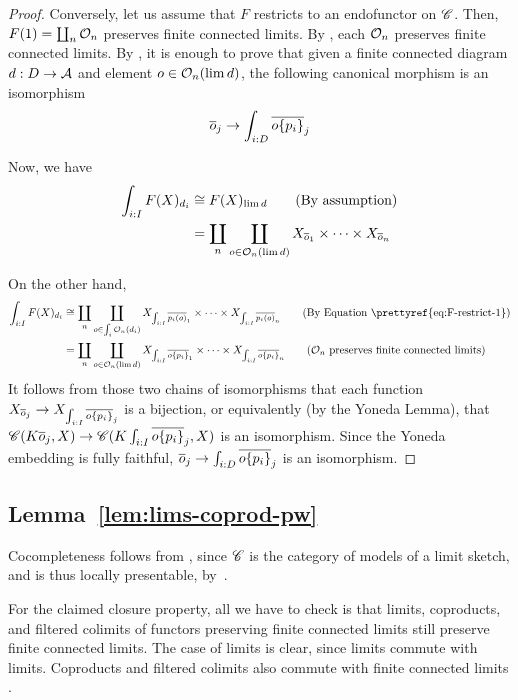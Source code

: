 \begin{proof}
Conversely, let us assume that $F$ restricts to an endofunctor on
$\C$. Then, $F(1)=\coprod_{n}\Oby n$ preserves finite connected
limits. By , each $\Oby n$ preserves finite
connected limits. By , it is enough to prove
that given a finite connected diagram $d:D\rightarrow{\cal A}$ and
element $o\in\Oop n{\lim d}$, the following canonical morphism is
an isomorphism
\[
\nthar oj\rightarrow\int_{i:D}\nthar{\rename o{p_{i}}}j
\]

Now, we have
\begin{align*}
\int_{i:I}F(X)_{d_{i}} & \cong F(X)_{\lim d}\tag{By assumption}\\
 & =\coprod_{n}\coprod_{o\in\Oop n{\lim d}}X_{\nthar o1}\times\dots\times X_{\nthar on}
\end{align*}

On the other hand,
\begin{align*}
\int_{i:I}F(X)_{d_{i}} & \cong\coprod_{n}\coprod_{o\in\int_{i}\Oop n{d_{i}}}X_{\int_{i:I}\nthar{p_{i}(o)}1}\times\dots\times X_{\int_{i:I}\nthar{p_{i}(o)}n}\tag{By Equation \prettyref{eq:F-restrict-1}}\\
 & =\coprod_{n}\coprod_{o\in\Oop n{\lim d}}X_{\int_{i:I}\nthar{\rename o{p_{i}}}1}\times\dots\times X_{\int_{i:I}\nthar{\rename o{p_{i}}}n}\tag{\ensuremath{\Oby n} preserves finite connected limits}
\end{align*}
It follows from those two chains of isomorphisms that each function
$X_{\nthar oj}\rightarrow X_{\int_{i:I}\nthar{\rename o{p_{i}}}j}$
is a bijection, or equivalently (by the Yoneda Lemma), that $\C(K\nthar oj,X)\rightarrow\C(K\int_{i:I}\nthar{\rename o{p_{i}}}j,X)$
is an isomorphism. Since the Yoneda embedding is fully faithful, $\nthar oj\rightarrow\int_{i:D}\nthar{\rename o{p_{i}}}j$
is an isomorphism.
\end{proof}

\subsection{Lemma~\ref{lem:lims-coprod-pw}}

\label{app:lims-coprod-pw}

Cocompleteness follows from \citet[Remark 1.56]{Adamek}, since $\C$
is the category of models of a limit sketch, and is thus locally presentable,
by~\citet[Proposition 1.51]{Adamek}. 

For the claimed closure property, all we have to check is that limits,
coproducts, and filtered colimits of functors preserving finite connected
limits still preserve finite connected limits. The case of limits
is clear, since limits commute with limits. Coproducts and filtered
colimits also commute with finite connected limits \citet[Example 1.3.(vi)]{classificationaccessible}.

